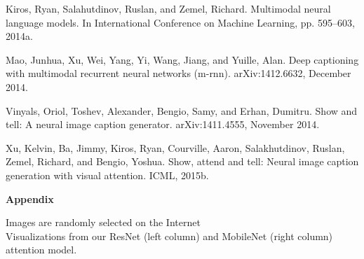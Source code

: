 \documentclass{article}
\begin{document}
Kiros, Ryan, Salahutdinov, Ruslan, and Zemel, Richard. Multimodal neural language models. In International Conference on
Machine Learning, pp. 595–603, 2014a.

Mao, Junhua, Xu, Wei, Yang, Yi, Wang, Jiang, and Yuille, Alan.
Deep captioning with multimodal recurrent neural networks
(m-rnn). arXiv:1412.6632, December 2014.

Vinyals, Oriol, Toshev, Alexander, Bengio, Samy, and Erhan,
Dumitru. Show and tell: A neural image caption generator.
arXiv:1411.4555, November 2014.

Xu, Kelvin, Ba, Jimmy, Kiros, Ryan, Courville, Aaron, Salakhutdinov, Ruslan, Zemel, Richard, and
Bengio, Yoshua. Show, attend and tell: Neural image caption generation with visual attention.
ICML, 2015b.



\newpage

\large \textbf {Appendix}

\small Images are randomly selected on the Internet\\
Visualizations from our ResNet (left column) and MobileNet (right column) attention model.
\end{document}

